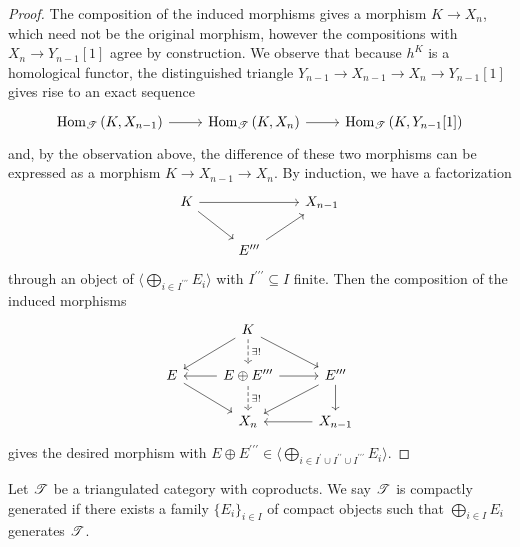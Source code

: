 \documentclass[dissertation.tex]{subfiles}
\begin{document}
\begin{lem}
\begin{proof}
    The composition of the induced morphisms gives a morphism $K \rightarrow X_n$, which need not be the original morphism, however the compositions with $X_n \rightarrow Y_{n-1}[1]$ agree by construction.
    We observe that because $h^{K}$ is a homological functor, the distinguished triangle $Y_{n-1} \rightarrow X_{n-1} \rightarrow X_{n} \rightarrow Y_{n-1}[1]$ gives rise to an exact sequence
    $$\begin{tikzcd}
      \Hom{\T}{K,X_{n-1}} \arrow{r} & \Hom{\T}{K,X_n} \arrow{r} & \Hom{\T}{K,Y_{n-1}[1]}
    \end{tikzcd}$$
    and, by the observation above, the difference of these two morphisms can be expressed as a morphism $K \rightarrow X_{n-1} \rightarrow X_n$.
    By induction, we have a factorization 
    $$\begin{tikzcd}
      K \arrow{rd}\arrow{rr} && X_{n-1}\\
      & E^{\prime\prime\prime}\arrow{ur}
    \end{tikzcd}$$
    through an object of $\langle \bigoplus_{i \in I^{\prime\prime\prime}} E_i\rangle$ with $I^{\prime\prime\prime} \subseteq I$ finite.
    Then the composition of the induced morphisms
    $$\begin{tikzcd}
      & K\arrow[dashed]{d}{\exists !}\arrow{ld}\arrow{rd}\\
      E\arrow{rd} & E \oplus E^{\prime\prime\prime} \arrow[dashed]{d}{\exists!}\arrow{r}\arrow{l} & E^{\prime\prime\prime}\arrow{d}\arrow{ld}\\
      & X_n & \arrow{l}X_{n-1}
    \end{tikzcd}$$
    gives the desired morphism with $E \oplus E^{\prime\prime\prime} \in \langle \bigoplus_{i \in I^\prime \cup I^{\prime\prime} \cup I^{\prime\prime\prime}} E_i\rangle.$
  \end{proof}
\end{lem}

\begin{defn}
  Let $\mathscr{T}$ be a triangulated category with coproducts.
  We say $\mathscr{T}$ is compactly generated if there exists a family $\{E_i\}_{i \in I}$ of compact objects such that $\bigoplus_{i \in I} E_i$ generates $\mathscr{T}$.
\end{defn}
\end{document}
